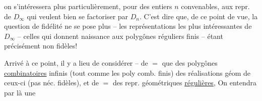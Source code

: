 on s'intéressera plus particulièrement, pour des entiers $n$ convenables, aux repr. de $D_\infty$ qui veulent bien se factoriser par $D_n$. C'est dire que,  de ce point de vue, la question de fidélité ne se pose plus -- les représentations les plus intéressantes  de $D_\infty$  -- celles qui donnent naissance aux  polygônes réguliers finis -- étant précisément non fidèles!

Arrivé à ce point, il y a lieu de considérer -- de $=$ que des polygônes \uline{combinatoires} infinis  (tout comme les poly comb. finis) des réalisations  géom de ceux-ci (pas néc. fidèles), et de $=$ des repr. géométriques \uline{régulières},     %
 On entendra par là une
